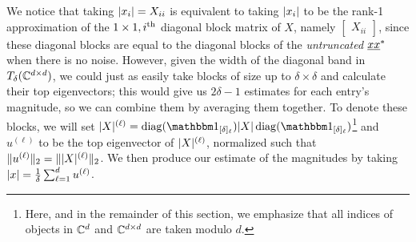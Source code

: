 We notice that taking $\lvert x_i\rvert = X_{ii}$ is equivalent to taking $\lvert x_i\rvert$ to be the rank-1 approximation of the $1 \times 1, i^{\text{th}}$ diagonal block matrix of $X$, namely $\begin{bmatrix} X_{ii} \end{bmatrix}$, since these diagonal blocks are equal to the diagonal blocks of the \emph{untruncated} $\underline{x} \underline{x}^*$ when there is no noise.  However, given the width of the diagonal band in $T_\delta(\mathbb{C}^{d \times d})$, we could just as easily take blocks of size up to $\delta \times \delta$ and calculate their top eigenvectors; this would give us $2 \delta - 1$ estimates for each entry's magnitude, so we can combine them by averaging them together.  %
To denote these blocks, we will set $\abs{X}^{(\ell)} = \diag(\one_{[\delta]_\ell}) \abs{X} \diag(\one_{[\delta]_\ell})$\footnote{Here, and in the remainder of this section, we emphasize that all indices of objects in $\mathbb{C}^d$ and $\mathbb{C}^{d \times d}$ are taken modulo $d$.} and $u^{(\ell)}$ to be the top eigenvector of $\lvert X\rvert^{(\ell)}$, normalized such that $\lVert u^{(\ell)}\rVert_2 = \lVert\lvert X\rvert^{(\ell)}\rVert_2$.  We then produce our estimate of the magnitudes by taking $\lvert x\rvert = \frac{1}{\delta} \sum_{\ell = 1}^d u^{(\ell)}$.  

